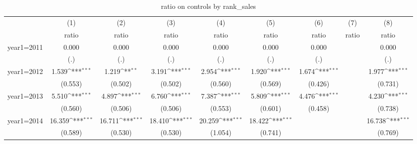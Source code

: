 \begin{table}[htbp]\centering
\def\sym#1{\ifmmode^{#1}\else\(^{#1}\)\fi}
\caption{ratio on controls by rank\_sales}
\begin{tabular}{l*{8}{c}}
\hline\hline
                    &\multicolumn{1}{c}{(1)}&\multicolumn{1}{c}{(2)}&\multicolumn{1}{c}{(3)}&\multicolumn{1}{c}{(4)}&\multicolumn{1}{c}{(5)}&\multicolumn{1}{c}{(6)}&\multicolumn{1}{c}{(7)}&\multicolumn{1}{c}{(8)}\\
                    &\multicolumn{1}{c}{ratio}&\multicolumn{1}{c}{ratio}&\multicolumn{1}{c}{ratio}&\multicolumn{1}{c}{ratio}&\multicolumn{1}{c}{ratio}&\multicolumn{1}{c}{ratio}&\multicolumn{1}{c}{ratio}&\multicolumn{1}{c}{ratio}\\
\hline
year1=2011          &       0.000         &       0.000         &       0.000         &       0.000         &       0.000         &       0.000         &                     &       0.000         \\
                    &         (.)         &         (.)         &         (.)         &         (.)         &         (.)         &         (.)         &                     &         (.)         \\
[1em]
year1=2012          &       1.539\sym{***}&       1.219\sym{**} &       3.191\sym{***}&       2.954\sym{***}&       1.920\sym{***}&       1.674\sym{***}&                     &       1.977\sym{***}\\
                    &     (0.553)         &     (0.502)         &     (0.502)         &     (0.560)         &     (0.569)         &     (0.426)         &                     &     (0.731)         \\
[1em]
year1=2013          &       5.510\sym{***}&       4.897\sym{***}&       6.760\sym{***}&       7.387\sym{***}&       5.809\sym{***}&       4.476\sym{***}&                     &       4.230\sym{***}\\
                    &     (0.560)         &     (0.506)         &     (0.506)         &     (0.553)         &     (0.601)         &     (0.458)         &                     &     (0.738)         \\
[1em]
year1=2014          &      16.359\sym{***}&      16.711\sym{***}&      18.410\sym{***}&      20.259\sym{***}&      18.422\sym{***}&                     &                     &      16.738\sym{***}\\
                    &     (0.589)         &     (0.530)         &     (0.530)         &     (1.054)         &     (0.741)         &                     &                     &     (0.769)         \\

\end{tabular}
\end{table}
